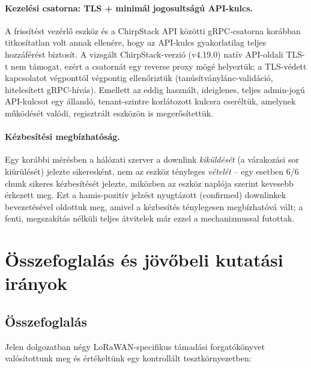 \documentclass[12pt,a4paper]{article}
\begin{document}
\paragraph{Kezelési csatorna: TLS + minimál jogosultságú API-kulcs.} A
frissítést vezérlő eszköz és a ChirpStack API közötti gRPC-csatorna
korábban titkosítatlan volt annak ellenére, hogy az API-kulcs gyakorlatilag
teljes hozzáférést biztosít. A vizsgált ChirpStack-verzió (v4.19.0) natív
API-oldali TLS-t nem támogat, ezért a csatornát egy reverse proxy mögé
helyeztük; a TLS-védett kapcsolatot végponttól végpontig ellenőriztük
(tanúsítványlánc-validáció, hitelesített gRPC-hívás). Emellett az eddig
használt, ideiglenes, teljes admin-jogú API-kulcsot egy állandó,
tenant-szintre korlátozott kulcsra cseréltük, amelynek működését valódi,
regisztrált eszközön is megerősítettük.

\paragraph{Kézbesítési megbízhatóság.} Egy korábbi mérésben a hálózati
szerver a downlink \emph{kiküldését} (a várakozási sor kiürülését) jelezte
sikeresként, nem az eszköz tényleges \emph{vételét} -- egy esetben 6/6 chunk
sikeres kézbesítését jelezte, miközben az eszköz naplója szerint kevesebb
érkezett meg. Ezt a hamis-pozitív jelzést nyugtázott (confirmed) downlinkek
bevezetésével oldottuk meg, amivel a kézbesítés ténylegesen megbízhatóvá vált; a
fenti, megszakítás nélküli teljes átvitelek már ezzel a mechanizmussal futottak.

\section{Összefoglalás és jövőbeli kutatási irányok}

\subsection{Összefoglalás}

Jelen dolgozatban négy LoRaWAN-specifikus támadási forgatókönyvet valósítottunk
meg és értékeltünk egy kontrollált tesztkörnyezetben:
\end{document}
